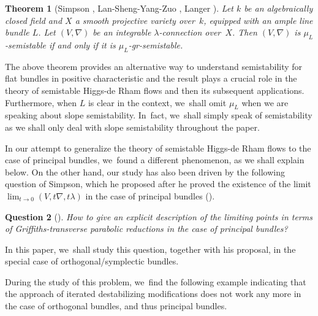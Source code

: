 \documentclass[11pt]{article}
\numberwithin{equation}{section}
\newcommand{\lconnection}{$\lambda$\nobreakdash-con\-nec\-tion\xspace}
\newcommand{\grsemistable}{gr\nobreakdash-semi\-stable\xspace}
\theoremstyle{plain}
\newtheorem{thm}{Theorem}[section]
\newtheorem{ques}[thm]{Question}
\theoremstyle{definition}
\begin{document}
\begin{thm}[{Simpson \cite[Th.\,2.5]{S10}, Lan-Sheng-Yang-Zuo \cite[Th.\,A.4]{LSZ19}, Langer \cite[Th.\,5.5]{L13}}]\label{the case of flat bundles}
Let $k$ be an algebraically closed field and $X$ a smooth projective variety over~$k$, equipped with an ample line bundle $L$. Let $(V,\nabla)$ be an integrable \lconnection over~$X$. Then $(V,\nabla)$ is $\mu_L$-semistable if and only if it is $\mu_L$-\grsemistable.
\end{thm}
The above theorem provides an alternative way to understand semistability for flat bundles in positive characteristic and the result plays a crucial role in the theory of semistable Higgs-de Rham flows \cite{LSZ19} and then its subsequent applications. Furthermore, when $L$ is clear in the context, we~shall omit $\mu_L$ when we are speaking about slope semistability. In~fact, we~shall simply speak of semistability as we shall only deal with slope semistability throughout the paper.

In our attempt to generalize the theory of semistable Higgs-de Rham flows to the case of principal bundles, we~found a different phenomenon, as we shall explain below. On the other hand, our study has also been driven by the following question of Simpson, which he proposed after he proved the existence of the limit $\lim_{t \to 0} (V, t\nabla, t\lambda)$ in the case of principal bundles (\cite[Cor.\,8.3]{S10}).
\begin{ques}[{\cite[Quest.\,8.4]{S10}}]\label{quest_simp}
How to give an explicit description of the limiting points in terms of Griffiths-transverse parabolic reductions in the case of principal bundles?
\end{ques}
In this paper, we~shall study this question, together with his proposal, in the special case of orthogonal/symplectic bundles.

During the study of this problem, we~find the following example indicating that the approach of iterated destabilizing modifications does not work any more in the case of orthogonal bundles, and thus principal bundles.
\end{document}
